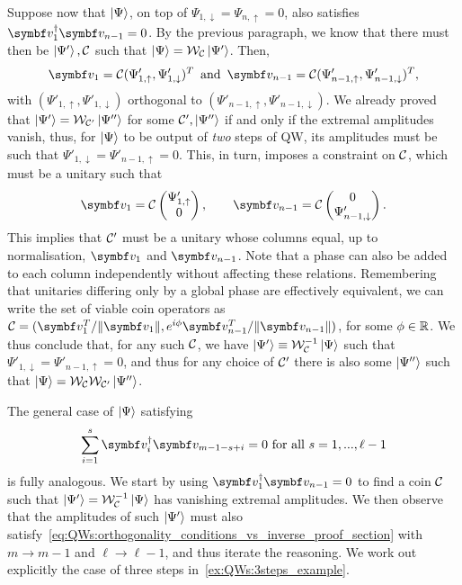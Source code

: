 Suppose now that $\ket\Psi$, on top of $\Psi_{1,\downarrow}=\Psi_{n,\uparrow}=0$, also satisfies $\bs v_1^\dagger \bs v_{n-1}=0$.
By the previous paragraph, we know that there must then be $\ket{\Psi'},{\mathcal{C}}$ such that $\ket\Psi={\mathcal{W}}_{\mathcal{C}}\ket{\Psi'}$. Then,
\begin{equation}
    \bs v_1=\calC(\Psi'_{1,\uparrow},\Psi'_{1,\downarrow})^T
    \,\text{ and }\,
    \bs v_{n-1}=\calC(\Psi'_{n-1,\uparrow},\Psi'_{n-1,\downarrow})^T,
\end{equation}
with $(\Psi'_{1,\uparrow},\Psi'_{1,\downarrow})$ orthogonal to
$(\Psi'_{n-1,\uparrow},\Psi'_{n-1,\downarrow})$.
We already proved that $\ket{\Psi'}={\mathcal{W}}_{{\mathcal{C}}'}\ket{\Psi''}$ for some ${\mathcal{C}}',\ket{\Psi''}$ if and only if the extremal amplitudes vanish, thus, for $\ket\Psi$ to be output of \emph{two} steps of QW, its amplitudes must be such that
$\Psi'_{1,\downarrow}=\Psi'_{n-1,\uparrow}=0$.
This, in turn, imposes a constraint on ${\mathcal{C}}$, which must be a unitary such that
\begin{equation}
    \bs v_1 = \calC \begin{pmatrix}
        \Psi'_{1,\uparrow} \\ 0
    \end{pmatrix}, \qquad
    \bs v_{n-1} = \calC \begin{pmatrix}
        0 \\ \Psi'_{n-1,\downarrow}
    \end{pmatrix}.
\end{equation}
This implies that ${\mathcal{C}}'$ must be a unitary whose columns equal, up to normalisation, $\bs v_1$ and $\bs v_{n-1}$. Note that a phase can also be added to each column independently without affecting these relations. Remembering that unitaries differing only by a global phase are effectively equivalent, we can write the set of viable coin operators as
$\calC = (\bs v_1^T/\|\bs v_1\|, e^{i\phi}\bs v_{n-1}^T/\|\bs v_{n-1}\|)$,
for some $\phi\in{\mathbb{R}}$.
We thus conclude that, for any such ${\mathcal{C}}$, we have $\ket{\Psi'}\equiv{\mathcal{W}}_{{\mathcal{C}}}^{-1}\ket\Psi$ such that $\Psi'_{1,\downarrow}=\Psi'_{n-1,\uparrow}=0$, and thus for any choice of ${\mathcal{C}}'$ there is also some $\ket{\Psi''}$ such that $\ket\Psi={\mathcal{W}}_{\mathcal{C}}{\mathcal{W}}_{{\mathcal{C}}'}\ket{\Psi''}$.

The general case of $\ket\Psi$ satisfying
\begin{equation}
    \sum_{i=1}^s \bs v_i^\dagger \bs v_{m-1-s+i}=0
    \text{ for all }s=1,...,\ell-1
    \label{eq:QWs:orthogonality_conditions_vs_inverse_proof_section}
\end{equation}
is fully analogous. We start by using $\bs v_1^\dagger \bs v_{n-1}=0$ to find a coin ${\mathcal{C}}$ such that $\ket{\Psi'}={\mathcal{W}}_{{\mathcal{C}}}^{-1}\ket\Psi$ has vanishing extremal amplitudes. We then observe that the amplitudes of such $\ket{\Psi'}$ must also satisfy~\cref{eq:QWs:orthogonality_conditions_vs_inverse_proof_section} with $m\to m-1$ and $\ell\to\ell-1$, and thus iterate the reasoning.
We work out explicitly the case of three steps in~\cref{ex:QWs:3steps_example}.

